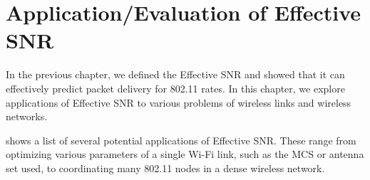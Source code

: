 \chapter{Application/Evaluation of Effective SNR}
\label{chap:esnr_eval}



In the previous chapter, we defined the Effective SNR and showed that it can effectively predict packet delivery for 802.11 rates. In this chapter, we explore applications of Effective SNR to various problems of wireless links and wireless networks.

 shows a list of several potential applications of Effective SNR. These range from optimizing various parameters of a single Wi-Fi link, such as the MCS or antenna set used, to coordinating many 802.11 nodes in a dense wireless network.